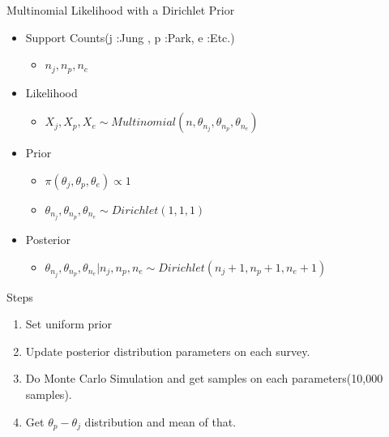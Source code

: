 \documentclass[ignorenonframetext,]{beamer}
\begin{document}
\begin{frame}{Multinomial Likelihood with a Dirichlet Prior}

\begin{itemize}
\itemsep1pt\parskip0pt
\item
  Support Counts(j :Jung , p :Park, e :Etc.)

  \begin{itemize}
  \itemsep1pt\parskip0pt
  \item
    $n_j, n_p, n_e$
  \end{itemize}
\item
  Likelihood

  \begin{itemize}
  \itemsep1pt\parskip0pt
  \item
    $X_j,X_p,X_e \sim Multinomial(n, \theta_{n_j}, \theta_{n_p}, \theta_{n_e})$
  \end{itemize}
\item
  Prior

  \begin{itemize}
  \itemsep1pt\parskip0pt
  \item
    $\pi(\theta_j, \theta_p, \theta_e) \propto 1$
  \item
    $\theta_{n_j}, \theta_{n_p}, \theta_{n_e} \sim Dirichlet(1,1,1)$
  \end{itemize}
\item
  Posterior

  \begin{itemize}
  \itemsep1pt\parskip0pt
  \item
    $\theta_{n_j}, \theta_{n_p}, \theta_{n_e}|n_j,n_p,n_e \sim Dirichlet(n_j + 1, n_p + 1, n_e + 1)$
  \end{itemize}
\end{itemize}

\end{frame}

\begin{frame}{Steps}

\begin{enumerate}
\def\labelenumi{\arabic{enumi}.}
\itemsep1pt\parskip0pt
\item
  Set uniform prior
\item
  Update posterior distribution parameters on each survey.
\item
  Do Monte Carlo Simulation and get samples on each parameters(10,000
  samples).
\item
  Get $\theta_p - \theta_j$ distribution and mean of that.
\end{enumerate}

\end{frame}
\end{document}
